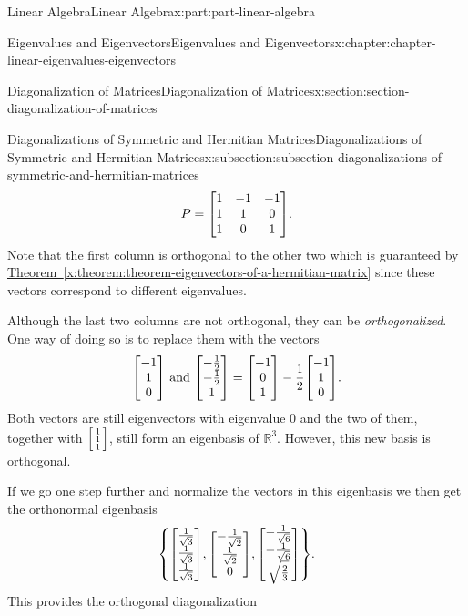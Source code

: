 \documentclass[twoside,10pt,]{book}
\newcommand{\xreffont}{\relax}
\numberwithin{equation}{part}
\newcommand{\RR}{\mathbb{R}}
\begin{document}
\begin{partptx}{Linear Algebra}{}{Linear Algebra}{}{}{x:part:part-linear-algebra}
\begin{chapterptx}{Eigenvalues and Eigenvectors}{}{Eigenvalues and Eigenvectors}{}{}{x:chapter:chapter-linear-eigenvalues-eigenvectors}
\begin{sectionptx}{Diagonalization of Matrices}{}{Diagonalization of Matrices}{}{}{x:section:section-diagonalization-of-matrices}
\begin{subsectionptx}{Diagonalizations of Symmetric and Hermitian Matrices}{}{Diagonalizations of Symmetric and Hermitian Matrices}{}{}{x:subsection:subsection-diagonalizations-of-symmetric-and-hermitian-matrices}
\begin{equation*}
P = \mqty[1 & -1 & -1 \\ 1 & 1 & 0 \\ 1 & 0 & 1]\text{.}
\end{equation*}
Note that the first column is orthogonal to the other two which is guaranteed by \hyperref[x:theorem:theorem-eigenvectors-of-a-hermitian-matrix]{Theorem~{\xreffont\ref{x:theorem:theorem-eigenvectors-of-a-hermitian-matrix}}} since these vectors correspond to different eigenvalues.%
\par
Although the last two columns are not orthogonal, they can be \emph{orthogonalized}. One way of doing so is to replace them with the vectors%
\begin{equation*}
\mqty[-1\\1\\0]\text{ and }\mqty[-\frac{1}{2} \\ -\frac{1}{2} \\ 1] = \mqty[-1\\0\\1]-\frac{1}{2}\mqty[-1\\1\\0]\text{.}
\end{equation*}
Both vectors are still eigenvectors with eigenvalue \(0\) and the two of them, together with \(\smqty[1\\1\\1]\), still form an eigenbasis of \(\RR^3\). However, this new basis is orthogonal.%
\par
If we go one step further and normalize the vectors in this eigenbasis we then get the orthonormal eigenbasis%
\begin{equation*}
\qty{\mqty[\frac{1}{\sqrt{3}} \\ \frac{1}{\sqrt{3}} \\ \frac{1}{\sqrt{3}}], \mqty[-\frac{1}{\sqrt{2}} \\ \frac{1}{\sqrt{2}} \\ 0], \mqty[-\frac{1}{\sqrt{6}} \\ -\frac{1}{\sqrt{6}} \\ \sqrt{\frac{2}{3}}]}\text{.}
\end{equation*}
This provides the orthogonal diagonalization%
\begin{equation*}

\end{equation*}
\end{subsectionptx}
\end{sectionptx}
\end{chapterptx}
\end{partptx}
\end{document}
